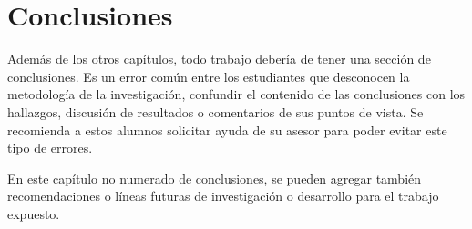 \chapter*{Conclusiones}
Además de los otros capítulos, todo trabajo debería de tener una sección de conclusiones. Es un error común entre los estudiantes que desconocen la metodología de la investigación, confundir el contenido de las conclusiones con los hallazgos, discusión de resultados o comentarios de sus puntos de vista. Se recomienda a estos alumnos solicitar ayuda de su asesor para poder evitar este tipo de errores.

En este capítulo no numerado de conclusiones, se pueden agregar también recomendaciones o líneas futuras de investigación o desarrollo para el trabajo expuesto.

